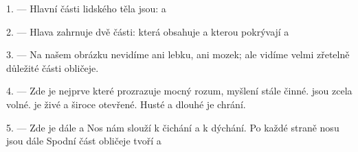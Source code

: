 %
%

\VUsaut{4.0mm}
\VUsaut{2.0mm}

\VUsaut{2.4mm}
\VUsaut{3.0mm}

1. --- Hlavní části lidského těla jsou:   a

\VUsaut{3.0mm}

2. --- Hlava zahrnuje dvě části:  která obsahuje  a kterou
pokrývají  a 

3. --- Na našem obrázku nevidíme ani lebku, ani mozek; ale vidíme velmi zřetelně důležité
části obličeje.

4. --- Zde je nejprve  které prozrazuje mocný rozum, myšlení stále činné.
 jsou zcela volné.  je živé a široce otevřené. Husté 
a dlouhé  je chrání.

5. --- Zde je dále  a  Nos nám slouží k čichání a k dýchání. Po
každé straně nosu jsou  dále  Spodní část obličeje tvoří
 a 

